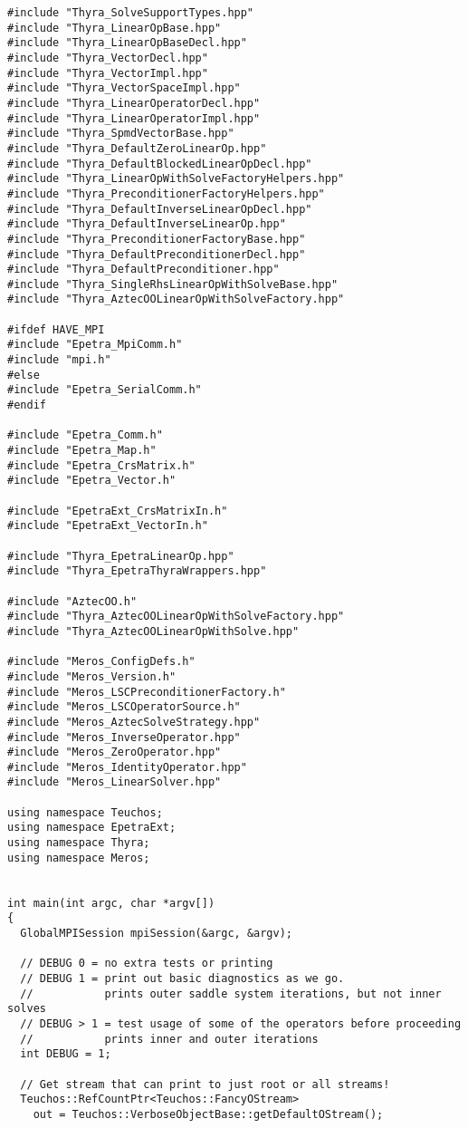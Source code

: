 \begin{verbatim}
#include "Thyra_SolveSupportTypes.hpp"
#include "Thyra_LinearOpBase.hpp"
#include "Thyra_LinearOpBaseDecl.hpp"
#include "Thyra_VectorDecl.hpp"
#include "Thyra_VectorImpl.hpp" 
#include "Thyra_VectorSpaceImpl.hpp"
#include "Thyra_LinearOperatorDecl.hpp"
#include "Thyra_LinearOperatorImpl.hpp"
#include "Thyra_SpmdVectorBase.hpp"
#include "Thyra_DefaultZeroLinearOp.hpp"
#include "Thyra_DefaultBlockedLinearOpDecl.hpp"
#include "Thyra_LinearOpWithSolveFactoryHelpers.hpp"
#include "Thyra_PreconditionerFactoryHelpers.hpp"
#include "Thyra_DefaultInverseLinearOpDecl.hpp"
#include "Thyra_DefaultInverseLinearOp.hpp"
#include "Thyra_PreconditionerFactoryBase.hpp"
#include "Thyra_DefaultPreconditionerDecl.hpp"
#include "Thyra_DefaultPreconditioner.hpp"
#include "Thyra_SingleRhsLinearOpWithSolveBase.hpp"
#include "Thyra_AztecOOLinearOpWithSolveFactory.hpp"

#ifdef HAVE_MPI
#include "Epetra_MpiComm.h"
#include "mpi.h"
#else
#include "Epetra_SerialComm.h"
#endif

#include "Epetra_Comm.h"
#include "Epetra_Map.h"
#include "Epetra_CrsMatrix.h"
#include "Epetra_Vector.h"

#include "EpetraExt_CrsMatrixIn.h"
#include "EpetraExt_VectorIn.h"

#include "Thyra_EpetraLinearOp.hpp"
#include "Thyra_EpetraThyraWrappers.hpp"

#include "AztecOO.h"
#include "Thyra_AztecOOLinearOpWithSolveFactory.hpp"
#include "Thyra_AztecOOLinearOpWithSolve.hpp"

#include "Meros_ConfigDefs.h"
#include "Meros_Version.h"
#include "Meros_LSCPreconditionerFactory.h"
#include "Meros_LSCOperatorSource.h"
#include "Meros_AztecSolveStrategy.hpp"
#include "Meros_InverseOperator.hpp"
#include "Meros_ZeroOperator.hpp"
#include "Meros_IdentityOperator.hpp"
#include "Meros_LinearSolver.hpp"

using namespace Teuchos;
using namespace EpetraExt;
using namespace Thyra;
using namespace Meros;


int main(int argc, char *argv[]) 
{
  GlobalMPISession mpiSession(&argc, &argv);

  // DEBUG 0 = no extra tests or printing
  // DEBUG 1 = print out basic diagnostics as we go.
  //           prints outer saddle system iterations, but not inner solves
  // DEBUG > 1 = test usage of some of the operators before proceeding
  //           prints inner and outer iterations
  int DEBUG = 1;

  // Get stream that can print to just root or all streams!
  Teuchos::RefCountPtr<Teuchos::FancyOStream>
    out = Teuchos::VerboseObjectBase::getDefaultOStream();


\end{verbatim}
